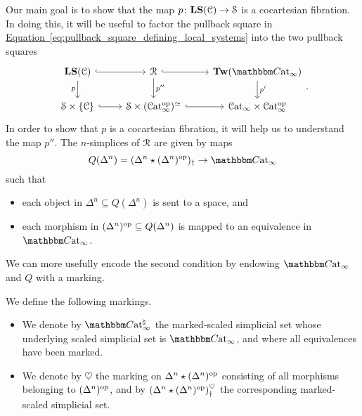 \documentclass[main.tex]{subfiles}
\begin{document}
Our main goal is to show that the map $p\colon \mathbf{LS}(\mathcal{C}) \to \mathcal{S}$ is a cocartesian fibration. In doing this, it will be useful to factor the pullback square in \hyperref[eq:pullback_square_defining_local_systems]{Equation~\ref*{eq:pullback_square_defining_local_systems}} into the two pullback squares
\begin{equation*}
  \begin{tikzcd}
    \LS(\category{C})
    \arrow[r, hook]
    \arrow[d, swap, "p"]
    & \mathcal{R}
    \arrow[r, hook]
    \arrow[d, "p''"]
    & \Tw(\ICCat)
    \arrow[d, "p'"]
    \\
    \S \times \{\category{C}\}
    \arrow[r, hook]
    & \S \times (\ICat\op)^{\simeq}
    \arrow[r, hook]
    & \ICat \times \ICat\op
  \end{tikzcd}.
\end{equation*}
In order to show that $p$ is a cocartesian fibration, it will help us to understand the map $p''$. The $n$-simplices of $\mathcal{R}$ are given by maps
\begin{equation*}
  Q(\Delta^{n}) = (\Delta^{n} \star (\Delta^{n})\op)_{\dagger} \to \ICCat
\end{equation*}
such that
\begin{itemize}
  \item each object in $\Delta^{n}\subseteq Q(\Delta^{n})$ is sent to a space, and

  \item each morphism in $(\Delta^{n})^{\mathrm{op}} \subseteq Q(\Delta^{n})$ is mapped to an equivalence in $\ICCat$.
\end{itemize}
We can more usefully encode the second condition by endowing $\ICCat$ and $Q$ with a marking.

\begin{definition}
  We define the following markings.
  \begin{itemize}
    \item We denote by $\ICCat^{\natural}$ the marked-scaled simplicial set whose underlying scaled simplicial set is $\ICCat$, and where all equivalences have been marked.

    \item We denote by $\heartsuit$ the marking on $\Delta^{n} \star (\Delta^{n})^{\mathrm{op}}$ consisting of all morphisms belonging to $(\Delta^{n})^{\mathrm{op}}$, and by $(\Delta^{n} \star (\Delta^{n})^{\mathrm{op}})^{\heartsuit}_{\dagger}$ the corresponding marked-scaled simplicial set.
  \end{itemize}
\end{definition}
\end{document}
